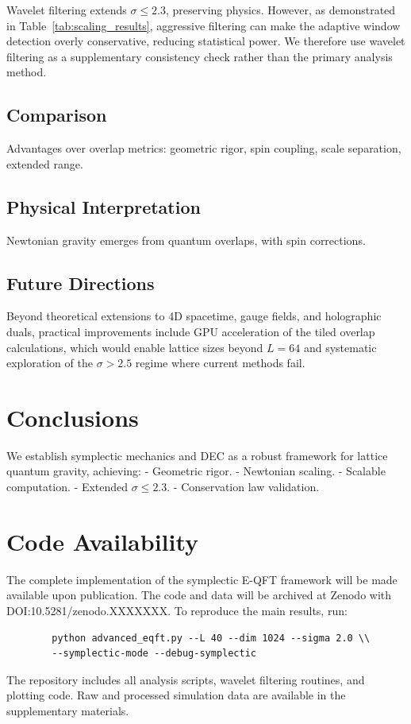 \documentclass[prd,twocolumn,showpacs,superscriptaddress]{revtex4-2}
\begin{document}
	Wavelet filtering extends \(\sigma \leq 2.3\), preserving physics. However, as demonstrated in Table~\ref{tab:scaling_results}, aggressive filtering can make the adaptive window detection overly conservative, reducing statistical power. We therefore use wavelet filtering as a supplementary consistency check rather than the primary analysis method.
	
	\subsection{Comparison}
	
	Advantages over overlap metrics: geometric rigor, spin coupling, scale separation, extended range.
	
	\subsection{Physical Interpretation}
	
	Newtonian gravity emerges from quantum overlaps, with spin corrections.
	
	\subsection{Future Directions}
	
	Beyond theoretical extensions to 4D spacetime, gauge fields, and holographic duals, practical improvements include GPU acceleration of the tiled overlap calculations, which would enable lattice sizes beyond $L=64$ and systematic exploration of the $\sigma > 2.5$ regime where current methods fail.
	
	\section{Conclusions}
	
	We establish symplectic mechanics and DEC as a robust framework for lattice quantum gravity, achieving:
	- Geometric rigor.
	- Newtonian scaling.
	- Scalable computation.
	- Extended \(\sigma \leq 2.3\).
	- Conservation law validation.
	
	\section*{Code Availability}
	
	The complete implementation of the symplectic E-QFT framework will be made available upon publication. The code and data will be archived at Zenodo with DOI:10.5281/zenodo.XXXXXXX. To reproduce the main results, run:
	\begin{verbatim}
		python advanced_eqft.py --L 40 --dim 1024 --sigma 2.0 \\
		--symplectic-mode --debug-symplectic
	\end{verbatim}
	The repository includes all analysis scripts, wavelet filtering routines, and plotting code. Raw and processed simulation data are available in the supplementary materials.
	
\end{document}
